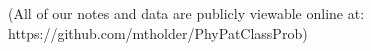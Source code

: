 \documentclass[a0paper,landscape]{baposter}
\begin{document}
\begin{poster}
{(All of our notes and data are publicly viewable online at: {https://github.com/mtholder/PhyPatClassProb})


}
\end{poster}
\end{document}
